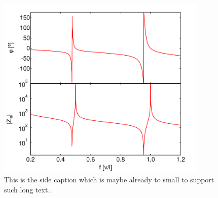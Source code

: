 \begin{figure}
	\includegraphics[width=10cm]{"./material/mathematica/cpw_lambda_over_4_phase_and_z"}
	\caption{This is the side caption which is maybe already to small to support such long text..}
	\label{fig:LambdaOver4ResonatorResponse}
\end{figure}

